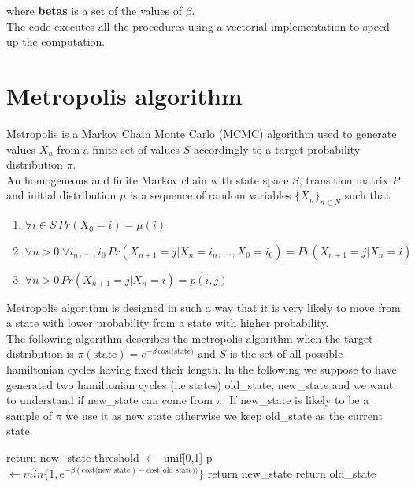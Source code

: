 \documentclass{article}
\begin{document}
\noindent where \textbf{betas} is a set of the values of $\beta$. \\ 
The code executes all the procedures using a vectorial implementation to speed up the computation.

\section{Metropolis algorithm}
Metropolis is a Markov Chain Monte Carlo (MCMC) algorithm used to generate values $X_n$ from a finite set of values $S$ accordingly to a target probability distribution $\pi$.  \\
An homogeneous and finite Markov chain with state space $S$, transition matrix $P$ and initial distribution $\mu$ is a sequence of random variables $\{ X_n \}_{n \in N}$ such that
\begin{enumerate}
\item $\forall i \in S \, Pr(X_0=i)= \mu(i)$ 
\item $\forall n > 0 \; \forall i_n,...,i_0 \,  Pr(X_{n+1} = j | X_n = i_n,..., X_0=i_0) = Pr(X_{n+1} = j | X_n = i)$
\item $\forall n > 0 \, Pr(X_{n+1} = j | X_n = i) = p(i,j) $
\end{enumerate}
Metropolis algorithm is designed in such a way that it is very likely to move from a state with lower probability from a state with higher probability. \\
The following algorithm describes the metropolis algorithm when the target distribution is $\pi(\text{state}) = e^{- \beta \, \text{cost(state)}}$ and $S$ is the set of all possible hamiltonian cycles having fixed their length. In the following we suppose to have generated two hamiltonian cycles (i.e states) old\_state, new\_state and we want to understand if new\_state can come from $\pi$. If new\_state is likely to be a sample of $\pi$ we use it as new state otherwise we keep old\_state as the current state.
\begin{algorithm}[H]
    \begin{algorithmic}[1]
      	\State return new\_state
      	\EndIf
        \State threshold $\leftarrow$ unif[0,1]
        \State p  $\leftarrow min\{1,e^{- \beta (\text{cost(new\_state}) - \text{cost(old\_state}))} \}$ 
        	\State return new\_state
        \Else
        	\State return old\_state
        \EndIf
       \EndFunction
\end{algorithmic}
\end{algorithm}
\noindent
\end{document}
